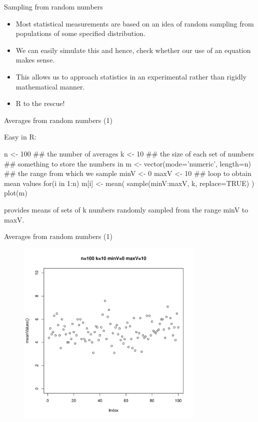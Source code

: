 \documentclass[pdf]{beamer}
\begin{document}
\begin{frame}{Sampling from random numbers}
  \begin{itemize}
  \item  Most statistical measurements are based on an idea of random sampling from
    populations of some specified distribution.
  \item We can easily simulate this and hence, check whether our use of an equation
    makes sense.
  \item This allows us to approach statistics in an experimental rather
    than rigidly mathematical manner.
  \item R to the rescue!
  \end{itemize}
\end{frame}

\begin{frame}[fragile]{Averages from random numbers (1)}

Easy in R:
\begin{rcode}
  n <- 100 ## the number of averages
  k <- 10  ## the size of each set of numbers
  ## something to store the numbers in
  m <- vector(mode='numeric', length=n) 
  ## the range from which we sample 
  minV <- 0
  maxV <- 10 
  ## loop to obtain mean values
  for(i in 1:n){
    m[i] <- mean( sample(minV:maxV, k, replace=TRUE) )
  }
  plot(m)
\end{rcode}

provides means of sets of k numbers randomly sampled from the range minV to maxV.

\end{frame}

\begin{frame}{Averages from random numbers (1)}

\begin{figure}[ht]
  \includegraphics[width=0.8\textwidth]{images/averages1}
\end{figure}
\end{frame}
\end{document}
